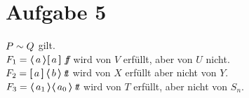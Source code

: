 \section*{Aufgabe 5}
$P \bisim Q$ gilt.\\
$F_1 = \poss{a}\necess{a}\false$ wird von $V$ erfüllt, aber von $U$ nicht.\\
$F_2 = \necess{a} \poss{b} \true$ wird von $X$ erfüllt aber nicht von $Y$.\\
$F_3 = \poss{a_1} \poss{a_0} \true $ wird von $T$ erfüllt, aber nicht von $S_n$.


